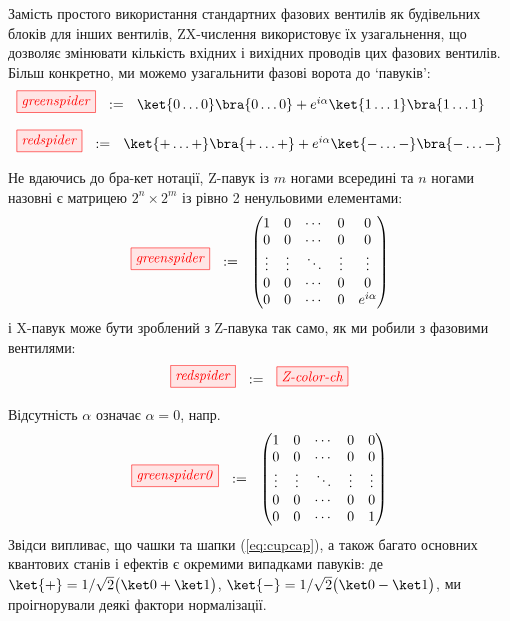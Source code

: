 \documentclass[11pt]{article}
\theoremstyle{definition}
\newcommand{\beq}{\begin{equation}}
\newcommand{\eeq}{\end{equation}\par\noindent}
\begin{document}
Замість простого використання стандартних фазових вентилів як будівельних блоків для інших вентилів, ZX-числення використовує їх узагальнення, що дозволяє змінювати кількість вхідних і вихідних проводів цих фазових вентилів. Більш конкретно, ми можемо узагальнити фазові ворота
до `павуків':   
\beq\label{eq:spiders}
\begin{array}{l}
\tikzfig{greenspider}\ \ :=\ \ \ket{0\ldots 0}\bra{0\ldots 0} + e^{i \alpha} \ket{1\ldots 1}\bra{1\ldots 1}
\vspace{4mm}\\
\tikzfig{redspider}\ \ :=\ \  \ket{+\ldots +}\bra{+\ldots +} + e^{i \alpha} \ket{-\ldots -}\bra{-\ldots -}
\end{array}  
\eeq
Не вдаючись до бра-кет нотації, Z-павук із $m$ ногами всередині та $n$ ногами назовні є матрицею $2^n \times 2^m$ із рівно 2 ненульовими елементами:
\[
\tikzfig{greenspider}\ \ :=\ \ 
\begin{pmatrix}
  1 & 0 & \cdots & 0 & 0 \\
  0 & 0 & \cdots & 0 & 0 \\
  \vdots & \vdots  & \ddots &  \vdots  &  \vdots  \\
  0 & 0 & \cdots & 0 & 0 \\
  0 & 0 & \cdots & 0 & e^{i\alpha} \\
\end{pmatrix}
\]
і X-павук може бути зроблений з Z-павука так само, як ми робили з фазовими вентилями:
\[
  \tikzfig{redspider} \ \ :=\ \ \tikzfig{Z-color-ch}
\]

Відсутність $\alpha$ означає $\alpha = 0$, напр.
\[
\tikzfig{greenspider0}\ \ :=\ \ 
\begin{pmatrix}
  1 & 0 & \cdots & 0 & 0 \\
  0 & 0 & \cdots & 0 & 0 \\
  \vdots & \vdots  & \ddots &  \vdots  &  \vdots  \\
  0 & 0 & \cdots & 0 & 0 \\
  0 & 0 & \cdots & 0 & 1 \\
\end{pmatrix}
\]
Звідси випливає, що чашки та шапки (\ref{eq:cupcap}), а також багато основних квантових станів і ефектів є окремими випадками павуків:
де $\ket{{+}} = 1/\sqrt{2} \big(\ket 0 + \ket 1\big)$, $\ket{{-}} = 1/\sqrt{2} \big(\ket 0 - \ket 1\big)$, ми проігнорували деякі фактори нормалізації.
\end{document}

